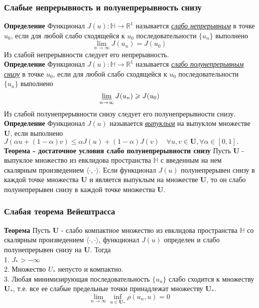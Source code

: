 \documentclass[A4]{article}
\begin{document}
\subsubsection{Слабые непрерывность и полунепрерывность снизу}
\textbf{Определение} Функционал $J(u):\mathbb{H}\rightarrow\mathbb{R}^1$ называется \underline{\emph{слабо непрерывным}} в точке $u_0$, если для любой слабо сходящейся к $u_0$ последовательности $\{u_n\}$ выполнено
\begin{equation*}
\lim_{n\rightarrow\infty}J(u_n)=J(u_0)
\end{equation*}
Из слабой непрерывности следует его непрерывность.\\
\textbf{Определение} Функционал $J(u):\mathbb{H}\rightarrow\mathbb{R}^1$ называется \underline{\emph{слабо полунепрерывным снизу}} в точке $u_0$, если для любой слабо сходящейся к $u_0$ последовательности $\{u_n\}$ выполнено
\begin{equation*}
\varliminf_{n\rightarrow\infty} J(u_n)\geqslant J(u_0)
\end{equation*}
Из слабой полунепрерывности снизу следует его полунепрерывности снизу.\\
\textbf{Определение} Функционал $J(u)$ называется \underline{\emph{выпуклым}} на выпуклом множестве $\mathbf{U}$, если выполнено $J(\alpha u+(1-\alpha)v)\leqslant\alpha J(u)+(1-\alpha)J(v)\quad\forall u,v\in\mathbf{U},\forall\alpha\in[0,1].$\\
\textbf{Теорема - достаточное условия слабо полунепрерывности снизу} Пусть $\mathbf{U}$ - выпуклое множество из евклидова пространства $\mathbb{H}$ с введенным на нем скалярным произведением $\langle\cdot,\cdot\rangle$. Если функционал $J(u)$ полунепрерывен снизу в каждой точке множества $\mathbf{U}$ и является выпуклым на множестве $\mathbf{U}$, то он слабо полунепрерывен снизу в каждой точке множества $\mathbf{U}$.\\
\subsubsection{Слабая теорема Вейештрасса}
\textbf{Теорема} Пусть $\mathbf{U}$ - слабо компактное множество из евклидова пространства $\mathbb{H}$ со скалярным произведением $\langle\cdot,\cdot\rangle$, функционал $J(u)$ определен и слабо полунепрерывен снизу на $\mathbf{U}$. Тогда\\
1. $J_*>-\infty$\\
2. Множество $U_*$ непусто и компактно.\\
3. Любая минимизирующая последовательность $\{u_n\}$ слабо сходится к множеству $\mathbf{U}_*$, т.е. все ее слабые предельные точки принадлежат множеству $\mathbf{U}_*$.
\begin{equation*}
\lim_{n\rightarrow\infty}\inf_{u\in\mathbf{U}_*}\rho(u_n,u)=0
\end{equation*}
\end{document}
